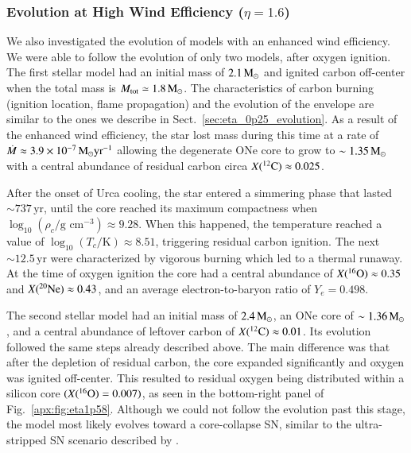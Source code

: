 \documentclass[main.tex]{subfiles}
\begin{document}
\subsubsection{Evolution at High Wind Efficiency ($\eta = 1.6$)} \label{sec:eta_1p58_evolution}
We also investigated the evolution of models with an enhanced wind efficiency. We were able to follow the evolution of only two models, after oxygen ignition. The first stellar model had an initial mass of $2.1\msun$ and ignited carbon off-center when the total mass is $M_\text{tot} \simeq 1.8\msun$. The characteristics of carbon burning (ignition location, flame propagation) and the evolution of the envelope are similar to the ones we describe in Sect.~\ref{sec:eta_0p25_evolution}. As a result of the enhanced wind efficiency, the star lost mass during this time at a rate of $\dot{M} \approx 3.9 \times 10^{-7}\msun \text{yr}^{-1}$ allowing the degenerate ONe core to grow to $\sim 1.35\msun$ with a central abundance of residual carbon circa $X(\iso{C}{12}) \approx 0.025$. 

After the onset of Urca cooling, the star entered a simmering phase that lasted $\sim 737\,\text{yr}$, until the core reached its maximum compactness when $\log_{10} (\rho_c / \text{g cm}^{-3}) \approx 9.28 $. When this happened, the temperature reached a value of $\log_{10} (T_c / \text{K}) \approx 8.51$, triggering residual carbon ignition. The next $\sim 12.5\,\text{yr}$ were  characterized by vigorous burning which led to a thermal runaway. At the time of oxygen ignition the core had a central abundance of  $X(\iso{O}{16}) \approx 0.35$ and $X(\iso{Ne}{20}) \approx 0.43$, and an average electron-to-baryon ratio of $Y_e = 0.498$.

The second stellar model had an initial mass of $2.4\msun$, an ONe core of $\sim 1.36\msun$, and a central abundance of leftover carbon of $X(\iso{C}{12}) \approx 0.01$. Its evolution followed the same steps already described above. The main difference was that after the depletion of residual carbon, the core expanded significantly and oxygen was ignited off-center. This resulted to  residual oxygen being distributed within a silicon core $(X(\iso{O}{16}) = 0.007)$, as seen in the bottom-right panel of Fig.~\ref{apx:fig:eta1p58}.
Although we could not follow the evolution past this stage, the model most likely evolves toward a core-collapse SN, similar to the ultra-stripped SN scenario described by \cite{Tauris:2015xra}.
\end{document}
